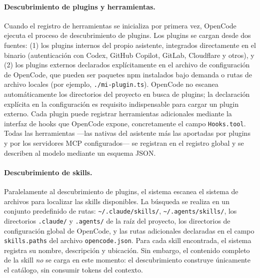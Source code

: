 \documentclass[11pt, letterpaper]{article}
\begin{document}
\paragraph{Descubrimiento de plugins y herramientas.}
Cuando el registro de herramientas se inicializa por primera vez, OpenCode ejecuta el proceso de descubrimiento de plugins. Los plugins se cargan desde dos fuentes: (1) los plugins internos del propio asistente, integrados directamente en el binario (autenticación con Codex, GitHub Copilot, GitLab, Cloudflare y otros), y (2) los plugins externos declarados explícitamente en el archivo de configuración de OpenCode, que pueden ser paquetes npm instalados bajo demanda o rutas de archivo locales (por ejemplo, \texttt{./mi-plugin.ts}). OpenCode no escanea automáticamente los directorios del proyecto en busca de plugins; la declaración explícita en la configuración es requisito indispensable para cargar un plugin externo. Cada plugin puede registrar herramientas adicionales mediante la interfaz de hooks que OpenCode expone, concretamente el campo \texttt{Hooks.tool}. Todas las herramientas ---las nativas del asistente más las aportadas por plugins y por los servidores MCP configurados--- se registran en el registro global y se describen al modelo mediante un esquema JSON.

\paragraph{Descubrimiento de skills.}
Paralelamente al descubrimiento de plugins, el sistema escanea el sistema de archivos para localizar las skills disponibles. La búsqueda se realiza en un conjunto predefinido de rutas: \texttt{\textasciitilde/.claude/skills/}, \texttt{\textasciitilde/.agents/skills/}, los directorios \texttt{.claude/} y \texttt{.agents/} de la raíz del proyecto, los directorios de configuración global de OpenCode, y las rutas adicionales declaradas en el campo \texttt{skills.paths} del archivo \texttt{opencode.json}. Para cada skill encontrada, el sistema registra su nombre, descripción y ubicación. Sin embargo, el contenido completo de la skill \textit{no} se carga en este momento: el descubrimiento construye únicamente el catálogo, sin consumir tokens del contexto.
\end{document}
